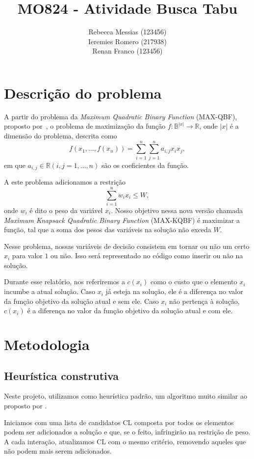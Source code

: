 \documentclass[11pt]{article}
\author{Rebecca Messias (123456) \\ Ieremies Romero (217938) \\ Renan Franco (123456)}
\date{}
\title{MO824 - Atividade Busca Tabu}
\begin{document}
\maketitle
\section*{Descrição do problema}
\label{sec:descricao}
A partir do problema da \emph{Maximum Quadratic Binary Function} (MAX-QBF), proposto por~\cite{qbf},  o problema de maximização da função \(f: \mathbb{B}^{|x|} \to \mathbb{R}\), onde \(|x|\) é a dimensão do problema, descrita como
\[f(x_{1},\dots, f(x_{n})) = \sum \limits_{i=1}^{n} \sum \limits_{j=1}^{n} a_{i,j} x_{i} x_{j} ,\]
 em que \(a_{i,j} \in \mathbb{R} (i,j = 1,\dots,n)\) são os coeficientes da função.

A este problema adicionamos a restrição
\[ \sum_{i=1}^{n} w_{i} x_{i} \leq W ,\]
onde \(w_{i}\) é dito o peso da variável \(x_{i}\). Nosso objetivo nessa nova versão chamada \emph{Maximum Knapsack Quadratic Binary Function} (MAX-KQBF) é maximizar a função, tal que a soma dos pesos das variáveis na solução não exceda \(W\).

Nesse problema, nossas variáveis de decisão consistem em tornar ou não um certo \(x_{i}\) para valor \(1\) ou não. Isso será representado no código como inserir ou não na solução.

Durante esse relatório, nos referiremos a \(c(x_{i})\) como o custo que o elemento \(x_{i}\) incumbe a atual solução. Caso \(x_{i}\) já esteja na solução, ele é a diferença no valor da função objetivo da solução atual e sem ele. Caso \(x_{i}\) não pertença à solução, \(c(x_{i})\) é a diferença no valor da função objetivo da solução atual e com ele.

\section*{Metodologia}
\label{sec:metodologia}

\subsection*{Heurística construtiva}
\label{sec:heuristica}
Neste projeto, utilizamos como heurística padrão, um algoritmo muito similar ao proposto por \cite{rezende19_grasp}.

Iniciamos com uma lista de candidatos CL composta por todos os elementos podem ser adicionados a solução e que, se o feito, infringirão na restrição de peso. A cada interação, atualizamos CL com o mesmo critério, removendo aqueles que não podem mais serem adicionados.
\end{document}
